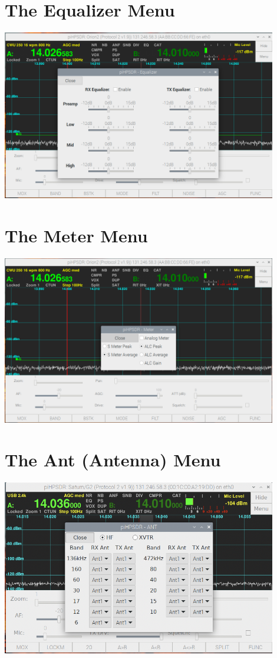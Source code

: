 \documentclass[12pt]{book}
\begin{document}
\section{The Equalizer Menu}
\begin{center}
\includegraphics[width=12cm]{EqualizerMenu.png}
\end{center}

\section{The Meter Menu}
\begin{center}
\includegraphics[width=12cm]{MeterMenu.png}
\end{center}

\section{The Ant (Antenna) Menu}
\begin{center}
\includegraphics[width=12cm]{AntMenu.png}
\end{center}
 
\end{document}
